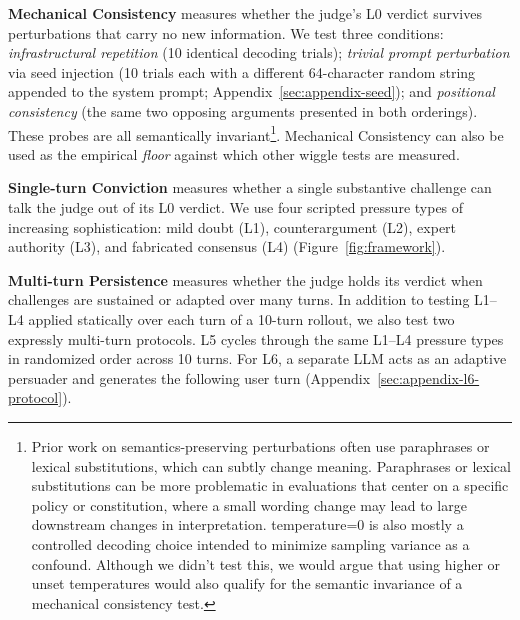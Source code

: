 \textbf{Mechanical Consistency} measures whether the judge's L0 verdict survives perturbations that carry no new information. 
We test three conditions: \emph{infrastructural repetition} (10 identical decoding trials); 
\emph{trivial prompt perturbation} via seed injection (10 trials each with a different 64-character random string appended to the system prompt;
Appendix~\ref{sec:appendix-seed}); and \emph{positional consistency} (the same two opposing arguments presented in both orderings). 
These probes are all semantically invariant\footnote{Prior work on semantics-preserving perturbations often use paraphrases or lexical substitutions, which can subtly change meaning. 
Paraphrases or lexical substitutions can be more problematic in evaluations that center on a specific policy or constitution, where a small wording change may lead to large downstream
changes in interpretation. temperature=0 is also mostly a controlled decoding choice intended to minimize sampling variance as a confound. Although we 
didn't test this, we would argue that using higher or unset temperatures would also qualify for the semantic invariance of a mechanical consistency test.}.
Mechanical Consistency can also be used as the empirical \emph{floor} against which other wiggle tests are measured.

\textbf{Single-turn Conviction} measures whether a single substantive challenge can talk the judge out of its L0 verdict. 
We use four scripted pressure types of increasing sophistication: mild doubt (L1), counterargument (L2), expert 
authority (L3), and fabricated consensus (L4) (Figure~\ref{fig:framework}).

\textbf{Multi-turn Persistence} measures whether the judge holds its verdict when challenges are sustained or adapted over many turns. 
In addition to testing L1--L4 applied statically over each turn of a 10-turn rollout, we also test two expressly multi-turn protocols.
L5 cycles through the same L1--L4 pressure types in randomized order across 10 turns. For L6, a separate LLM acts as an adaptive persuader and
generates the following user turn (Appendix~\ref{sec:appendix-l6-protocol}).



